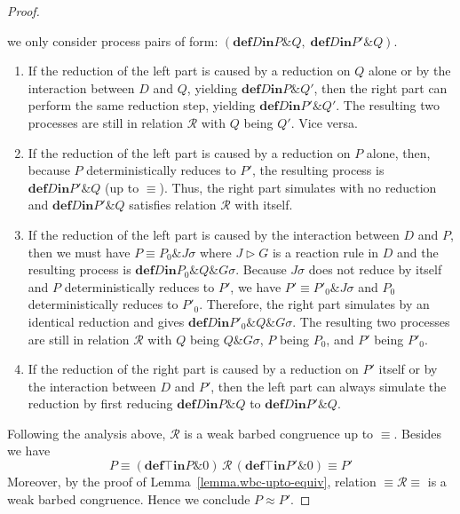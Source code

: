 \documentclass{LMCS}
\newcommand{\forget}[1]{}
\newcommand{\kwd}[1]{\ensuremath{\mathbf{#1}}}
\newcommand{\prefix}[1]{\mathopen{}\mathrel{\kwd {#1}}}
\newcommand{\infix}[1]{\mathrel{\kwd {#1}}}
\renewcommand{\_}{\mathord{\rule[-.25ex]{1ex}{.15ex}}}
\newcommand{\nullp}{0}
\newcommand{\para}[2]{#1\mathop{\&}#2}
\newcommand{\define}[2]{\prefix{def} #1 \infix{in} #2}
\newcommand{\reaction}[2]{#1 \triangleright #2}
\newcommand{\wbc}{\mathrel{\approx}}
\newcommand{\R}{\mathrel{\mathcal{R}}}
\begin{document}
\begin{proof}
\begin{enumerate}[$\bullet$]
    we only consider process pairs of form: $(\define{D}{\para{P}{Q}},
    \;\define{D}{\para{P'}{Q}})$.
    \begin{enumerate}[$-$]
    \item If the reduction of the left part is caused by a reduction
      on $Q$ alone or by the interaction between $D$ and $Q$, yielding
      $\define{D}{\para{P}{Q'}}$, then the right part can perform
      the same reduction step, yielding $\define{D}{\para{P'}{Q'}}$.
      The resulting two processes are still in relation $\R$ with $Q$
      being $Q'$. Vice versa.
    \item If the reduction of the left part is caused by a reduction
      on $P$ alone, then, because $P$ deterministically reduces to $P'$,
      the resulting process
      is $\define{D}{\para{P'}{Q}}$ (up to $\equiv$).
      Thus, the right part simulates
      with no reduction and $\define{D}{\para{P'}{Q}}$ satisfies
      relation $\R$ with itself.
    \item If the reduction of the left part is caused by the
      interaction between $D$ and $P$, then we must have $P \equiv
      \para{P_0}{{J}{\sigma}}$ where $\reaction{J}{G}$ is a reaction
      rule in $D$ and the resulting process is
      $\define{D}{\para{P_0}{\para{Q}{G\sigma}}}$. Because $J\sigma$
      does not reduce by itself and $P$ deterministically reduces to
      $P'$, we have $P' \equiv \para{P'_0}{{J}{\sigma}}$ and $P_0$
      deterministically reduces to $P'_0$. Therefore, the right part
      simulates by an identical reduction and gives
      $\define{D}{\para{P'_0}{\para{Q}{G\sigma}}}$. The resulting two
      processes are still in relation $\R$ with $Q$ being
      $\para{Q}{G\sigma}$, $P$ being $P_0$, and $P'$ being $P'_0$.
    \item If the reduction of the right part is caused by a reduction
      on $P'$ itself or by the interaction between $D$ and $P'$, then
      the left part can always simulate the reduction by first
      reducing $\define{D}{\para{P}{Q}}$ to
      $\define{D}{\para{P'}{Q}}$.
    \end{enumerate}
  \end{enumerate}
  Following the analysis above, $\R$ is a weak barbed congruence up to
  $\equiv$. Besides we have $$P \equiv
  (\define{\top}{\para{P}{\nullp}})\, \R \,
  (\define{\top}{\para{P'}{\nullp}})\equiv P'$$
  Moreover, by the proof of Lemma~\ref{lemma.wbc-upto-equiv},
  relation $\equiv \R \equiv$ is a weak barbed congruence. Hence we conclude
  $P \wbc P'$. \forget{\qed}
\end{proof}
\end{document}
